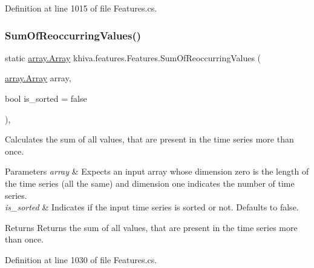 Definition at line 1015 of file Features.\+cs.

\mbox{\label{classkhiva_1_1features_1_1_features_afd4ed289029b84b26a55b7e3f358fd43}} 
\subsubsection{\texorpdfstring{Sum\+Of\+Reoccurring\+Values()}{SumOfReoccurringValues()}}
{\footnotesize\ttfamily static \mbox{\hyperlink{classkhiva_1_1array_1_1_array}{array.\+Array}} khiva.\+features.\+Features.\+Sum\+Of\+Reoccurring\+Values (\begin{DoxyParamCaption}\item[{\mbox{\hyperlink{classkhiva_1_1array_1_1_array}{array.\+Array}}}]{array,  }\item[{bool}]{is\+\_\+sorted = {\ttfamily false} }\end{DoxyParamCaption})\hspace{0.3cm}{\ttfamily [inline]}, {\ttfamily [static]}}



Calculates the sum of all values, that are present in the time series more than once. 


\begin{DoxyParams}{Parameters}
{\em array} & Expects an input array whose dimension zero is the length of the time series (all the same) and dimension one indicates the number of time series.\\
\hline
{\em is\+\_\+sorted} & Indicates if the input time series is sorted or not. Defaults to false.\\
\hline
\end{DoxyParams}
\begin{DoxyReturn}{Returns}
Returns the sum of all values, that are present in the time series more than once.
\end{DoxyReturn}


Definition at line 1030 of file Features.\+cs.

\mbox{\label{classkhiva_1_1features_1_1_features_a4ff27da1f1df300039a060ae5495383b}} 
